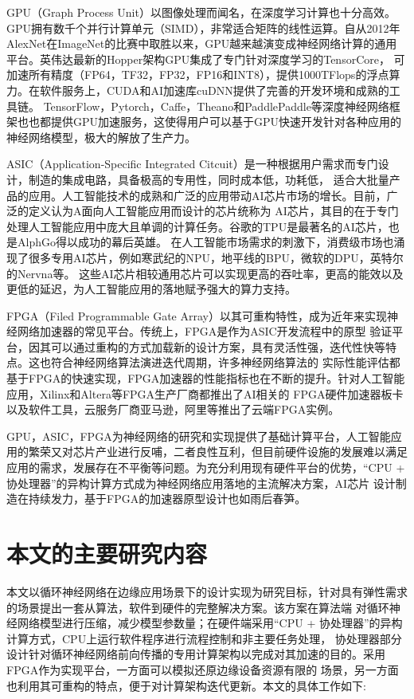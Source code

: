 GPU（Graph Process Unit）以图像处理而闻名，在深度学习计算也十分高效。GPU拥有数千个并行计算单元（SIMD），非常适合矩阵的线性运算。自从2012年
AlexNet在ImageNet的比赛中取胜以来，GPU越来越演变成神经网络计算的通用平台。英伟达最新的Hopper架构\citing{}GPU集成了专门针对深度学习的TensorCore，
可加速所有精度（FP64，TF32，FP32，FP16和INT8），提供1000TFlops的浮点算力。在软件服务上，CUDA和AI加速库cuDNN提供了完善的开发环境和成熟的工具链。
TensorFlow，Pytorch，Caffe，Theano和PaddlePaddle等深度神经网络框架也也都提供GPU加速服务，这使得用户可以基于GPU快速开发针对各种应用的
神经网络模型，极大的解放了生产力。

ASIC（Application-Specific Integrated Citcuit）是一种根据用户需求而专门设计，制造的集成电路，具备极高的专用性，同时成本低，功耗低，
适合大批量产品的应用。人工智能技术的成熟和广泛的应用带动AI芯片市场的增长。目前，广泛的定义认为A面向人工智能应用而设计的芯片统称为
AI芯片，其目的在于专门处理人工智能应用中庞大且单调的计算任务。谷歌的TPU是最著名的AI芯片，也是AlphGo得以成功的幕后英雄。
在人工智能市场需求的刺激下，消费级市场也涌现了很多专用AI芯片，例如寒武纪的NPU，地平线的BPU，微软的DPU，英特尔的Nervna等。
这些AI芯片相较通用芯片可以实现更高的吞吐率，更高的能效以及更低的延迟，为人工智能应用的落地赋予强大的算力支持。

FPGA（Filed Programmable Gate Array）以其可重构特性，成为近年来实现神经网络加速器的常见平台。传统上，FPGA是作为ASIC开发流程中的原型
验证平台，因其可以通过重构的方式加载新的设计方案，具有灵活性强，迭代性快等特点。这也符合神经网络算法演进迭代周期，许多神经网络算法的
实际性能评估都基于FPGA的快速实现，FPGA加速器的性能指标也在不断的提升。针对人工智能应用，Xilinx和Altera等FPGA生产厂商都推出了AI相关的
FPGA硬件加速器板卡以及软件工具，云服务厂商亚马逊，阿里等推出了云端FPGA实例。

GPU，ASIC，FPGA为神经网络的研究和实现提供了基础计算平台，人工智能应用的繁荣又对芯片产业进行反哺，二者良性互利，但目前硬件设施的发展难以满足
应用的需求，发展存在不平衡等问题。为充分利用现有硬件平台的优势，“CPU + 协处理器”的异构计算方式成为神经网络应用落地的主流解决方案，AI芯片
设计制造在持续发力，基于FPGA的加速器原型设计也如雨后春笋。
\section{本文的主要研究内容}
本文以循环神经网络在边缘应用场景下的设计实现为研究目标，针对具有弹性需求的场景提出一套从算法，软件到硬件的完整解决方案。该方案在算法端
对循环神经网络模型进行压缩，减少模型参数量；在硬件端采用“CPU + 协处理器”的异构计算方式，CPU上运行软件程序进行流程控制和非主要任务处理，
协处理器部分设计针对循环神经网络前向传播的专用计算架构以完成对其加速的目的。采用FPGA作为实现平台，一方面可以模拟还原边缘设备资源有限的
场景，另一方面也利用其可重构的特点，便于对计算架构迭代更新。本文的具体工作如下:

